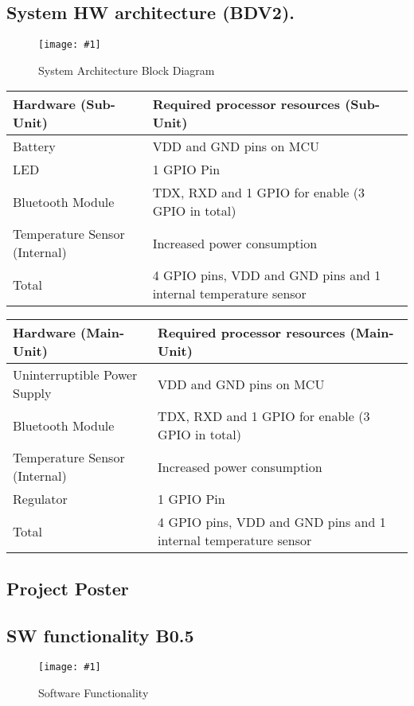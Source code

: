 \documentclass[12pt]{article} \usepackage{jeep} \usepackage{unicode}
\newcommand\createfigure[2]{
  \begin{figure}[H]
    \centering \texttt{[image: \#1]}
    \caption{#2}
  \end{figure}}
\begin{document}
\subsection{System HW architecture (BDV2).}
\createfigure{../Figures/system-architecture-block-diagram.jpg}{System
  Architecture Block Diagram}
\newpage
\begin{center}
  \begin{tabularx}{\textwidth}{|X|X|}
    \hline
    Hardware (Sub-Unit) & Required processor resources (Sub-Unit)\\
    \hline
    Battery & VDD and GND pins on MCU\\
    \hline
    LED & 1 GPIO Pin\\
    \hline
    Bluetooth Module & TDX, RXD and 1 GPIO for enable (3 GPIO in total)\\
    \hline
    Temperature Sensor (Internal) & Increased power consumption\\
    \hline
    Total & 4 GPIO pins, VDD and GND pins and 1 internal temperature sensor\\
    \hline
  \end{tabularx}
\end{center}
\begin{center}
  \begin{tabularx}{\textwidth}{|X|X|}
    \hline
    Hardware (Main-Unit) & Required processor resources (Main-Unit)\\
    \hline
    Uninterruptible Power Supply & VDD and GND pins on MCU\\
    \hline
    Bluetooth Module & TDX, RXD and 1 GPIO for enable (3 GPIO in total)\\
    \hline
    Temperature Sensor (Internal) & Increased power consumption\\
    \hline
    Regulator & 1 GPIO Pin\\
    \hline
    Total & 4 GPIO pins, VDD and GND pins and 1 internal temperature sensor\\
    \hline
  \end{tabularx}
\end{center}
\subsection{Project Poster}

\subsection{SW functionality B0.5}
\createfigure{../Figures/SW functionality B0.5.jpg}{Software Functionality}
\end{document}
